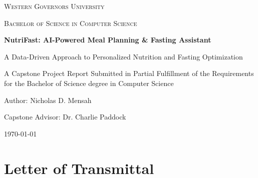 \documentclass[12pt]{report}
\begin{document}
\begin{titlepage}
    \centering

    {\scshape\LARGE Western Governors University\par}
    \vspace{1.5cm}

    {\scshape\Large Bachelor of Science in Computer Science\par}
    \vspace{2cm}

    {\huge\bfseries NutriFast: AI-Powered Meal Planning \& Fasting Assistant\par}
    \vspace{0.5cm}

    {\Large A Data-Driven Approach to Personalized Nutrition and Fasting Optimization\par}
    \vspace{1.5cm}

    {\Large A Capstone Project Report Submitted in Partial Fulfillment of the Requirements for the Bachelor of Science degree in Computer Science\par}
    \vspace{2cm}

    {\Large Author: Nicholas D. Mensah\par}
    \vspace{0.5cm}

    {\Large Capstone Advisor: Dr. Charlie Paddock\par}
    \vspace{2cm}

    {\Large \today\par}
    \vfill
\end{titlepage}

\tableofcontents
\newpage

\listoffigures
\newpage

\listoftables
\newpage

\chapter*{Letter of Transmittal}

\doublespacing
\end{document}
